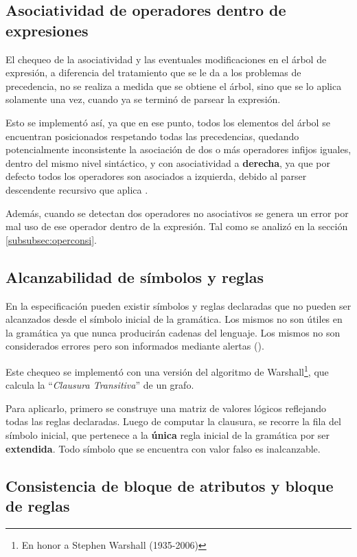 \subsection{Asociatividad de operadores dentro de expresiones}

El chequeo de la asociatividad y las eventuales modificaciones en el árbol de expresión, a diferencia del tratamiento que se le da a los problemas de precedencia, no se realiza a medida que se obtiene el árbol, sino que se lo aplica solamente una vez, cuando ya se terminó de parsear la expresión.

Esto se implementó así, ya que en ese punto, todos los elementos del árbol se encuentran posicionados respetando todas las precedencias, quedando potencialmente inconsistente la asociación de dos o más operadores infijos iguales, dentro del mismo nivel sintáctico, y con asociatividad a \textbf{derecha}, ya que por defecto todos los operadores son asociados a izquierda, debido al parser descendente recursivo que aplica \spirit.

Además, cuando se detectan dos operadores no asociativos se genera un error por mal uso de ese operador dentro de la expresión. Tal como se analizó en la sección \ref{subsubsec:operconsi}.

\subsection{Alcanzabilidad de símbolos y reglas}

En la especificación pueden existir símbolos y reglas declaradas que no pueden ser alcanzados desde el símbolo inicial de la gramática. Los mismos no son útiles en la gramática ya que nunca producirán cadenas del lenguaje. Los mismos no son considerados errores pero son informados mediante alertas ().

Este chequeo se implementó con una versión del algoritmo de Warshall\footnote{En honor a Stephen Warshall (1935-2006)}, que calcula la ``\textit{Clausura Transitiva}'' de un grafo.

Para aplicarlo, primero se construye una matriz de valores lógicos reflejando todas las reglas declaradas. Luego de computar la clausura, se recorre la fila del símbolo inicial, que pertenece a la \textbf{única} regla inicial de la gramática por ser \textbf{extendida}. Todo símbolo que se encuentra con valor falso es inalcanzable.

\subsection{Consistencia de bloque de atributos y bloque de reglas}

